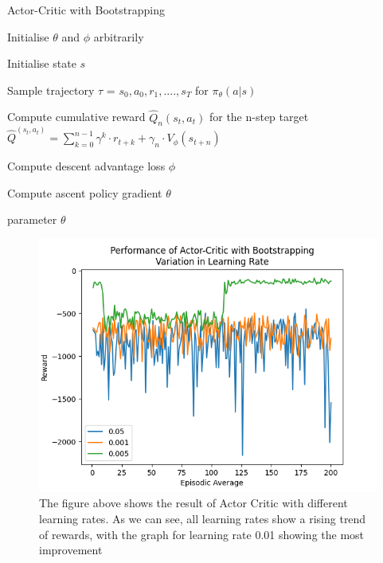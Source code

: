 \documentclass{article}
\begin{document}
\begin{algorithm}[htbp]
\caption{Actor-Critic with Bootstrapping}
\SetAlgoLined
\DontPrintSemicolon
\small %
Initialise $\theta$ and $\phi$ arbitrarily\;\\
{
    \item Initialise state $s$\;
    \item Sample trajectory $\tau$ = ${s_0,a_0,r_1,....,s_T}$ for $\pi_\theta(a|s)$
     \item 
    {
     \item Compute cumulative reward $\hat{Q}_n(s_t,a_t)$ for the n-step target
     \newline \(\hat{Q}^(s_t,a_t) = \sum_{k=0}^{n-1}\gamma^k\cdot r_{t+k} + \gamma_n \cdot V_\phi (s_{t+n})\)
    }
    \item Compute descent advantage loss $\phi$
    \item Compute ascent policy gradient $\theta$
}
\State \Return parameter $\theta$
\end{algorithm}

\begin{figure}[htbp]
    \centering
\includegraphics[width=0.9\linewidth]{Report/images/Performance_of_Actor_Critic_BS_LR.png}
\caption{\label{fig:ActorCritic for different learning rates}The figure above shows the result of Actor Critic with different learning rates. As we can see, all learning rates show a rising trend of rewards, with the graph for learning rate 0.01 showing the most improvement}
\end{figure}
\end{document}
